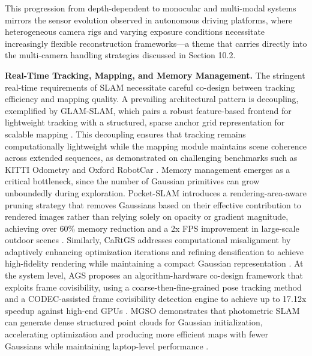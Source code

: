 \documentclass[11pt]{article}
\begin{document}
This progression from depth-dependent to monocular and multi-modal systems mirrors the sensor evolution observed in autonomous driving platforms, where heterogeneous camera rigs and varying exposure conditions necessitate increasingly flexible reconstruction frameworks---a theme that carries directly into the multi-camera handling strategies discussed in Section 10.2.

\textbf{Real-Time Tracking, Mapping, and Memory Management.} The stringent real-time requirements of SLAM necessitate careful co-design between tracking efficiency and mapping quality. A prevailing architectural pattern is decoupling, exemplified by GLAM-SLAM, which pairs a robust feature-based frontend for lightweight tracking with a structured, sparse anchor grid representation for scalable mapping \cite{ref245}. This decoupling ensures that tracking remains computationally lightweight while the mapping module maintains scene coherence across extended sequences, as demonstrated on challenging benchmarks such as KITTI Odometry and Oxford RobotCar \cite{ref245}. Memory management emerges as a critical bottleneck, since the number of Gaussian primitives can grow unboundedly during exploration. Pocket-SLAM introduces a rendering-area-aware pruning strategy that removes Gaussians based on their effective contribution to rendered images rather than relying solely on opacity or gradient magnitude, achieving over 60\% memory reduction and a 2x FPS improvement in large-scale outdoor scenes \cite{ref638}. Similarly, CaRtGS addresses computational misalignment by adaptively enhancing optimization iterations and refining densification to achieve high-fidelity rendering while maintaining a compact Gaussian representation \cite{ref639}. At the system level, AGS proposes an algorithm-hardware co-design framework that exploits frame covisibility, using a coarse-then-fine-grained pose tracking method and a CODEC-assisted frame covisibility detection engine to achieve up to 17.12x speedup against high-end GPUs \cite{ref640}. MGSO demonstrates that photometric SLAM can generate dense structured point clouds for Gaussian initialization, accelerating optimization and producing more efficient maps with fewer Gaussians while maintaining laptop-level performance \cite{ref641}.
\end{document}
